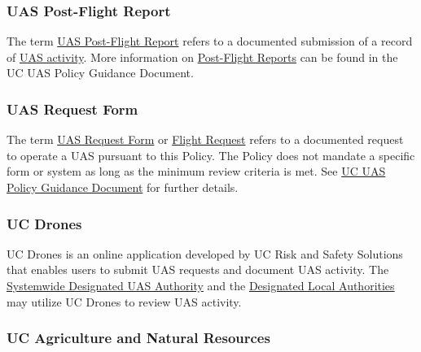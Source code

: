 \documentclass[
]{book}
\begin{document}
\hypertarget{postflight}{%
\subsubsection*{UAS Post-Flight Report}\label{postflight}}

The term \protect\hyperlink{postflight}{UAS Post-Flight Report} refers to a documented submission of a record of \protect\hyperlink{UASactivity}{UAS activity}. More information on \protect\hyperlink{postflight}{Post-Flight Reports} can be found in the UC UAS Policy Guidance Document.







\hypertarget{FR}{%
\subsubsection*{UAS Request Form}\label{FR}}

The term \protect\hyperlink{FR}{UAS Request Form} or \protect\hyperlink{FR}{Flight Request} refers to a documented request to operate a UAS pursuant to this Policy. The Policy does not mandate a specific form or system as long as the minimum review criteria is met. See \protect\hyperlink{UASPGD}{UC UAS Policy Guidance Document} for further details.





\hypertarget{UCDrones}{%
\subsubsection*{UC Drones}\label{UCDrones}}

UC Drones is an online application developed by UC Risk and Safety Solutions that enables users to submit UAS requests and document UAS activity. The \protect\hyperlink{SDA}{Systemwide Designated UAS Authority} and the \protect\hyperlink{DLA}{Designated Local Authorities} may utilize UC Drones to review UAS activity.



\hypertarget{ANR}{%
\subsubsection*{UC Agriculture and Natural Resources}\label{ANR}}
\end{document}

